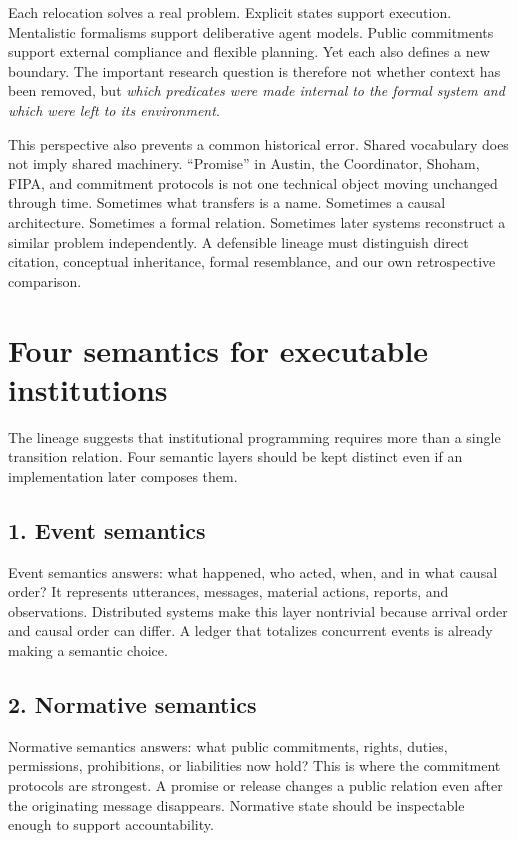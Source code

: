\documentclass[11pt]{article}
\begin{document}
Each relocation solves a real problem. Explicit states support execution. Mentalistic formalisms support deliberative agent models. Public commitments support external compliance and flexible planning. Yet each also defines a new boundary. The important research question is therefore not whether context has been removed, but \emph{which predicates were made internal to the formal system and which were left to its environment}.

This perspective also prevents a common historical error. Shared vocabulary does not imply shared machinery. ``Promise'' in Austin, the Coordinator, Shoham, FIPA, and commitment protocols is not one technical object moving unchanged through time. Sometimes what transfers is a name. Sometimes a causal architecture. Sometimes a formal relation. Sometimes later systems reconstruct a similar problem independently. A defensible lineage must distinguish direct citation, conceptual inheritance, formal resemblance, and our own retrospective comparison.

\section{Four semantics for executable institutions}
The lineage suggests that institutional programming requires more than a single transition relation. Four semantic layers should be kept distinct even if an implementation later composes them.

\subsection*{1. Event semantics}
Event semantics answers: what happened, who acted, when, and in what causal order? It represents utterances, messages, material actions, reports, and observations. Distributed systems make this layer nontrivial because arrival order and causal order can differ. A ledger that totalizes concurrent events is already making a semantic choice.

\subsection*{2. Normative semantics}
Normative semantics answers: what public commitments, rights, duties, permissions, prohibitions, or liabilities now hold? This is where the commitment protocols are strongest. A promise or release changes a public relation even after the originating message disappears. Normative state should be inspectable enough to support accountability.
\end{document}
